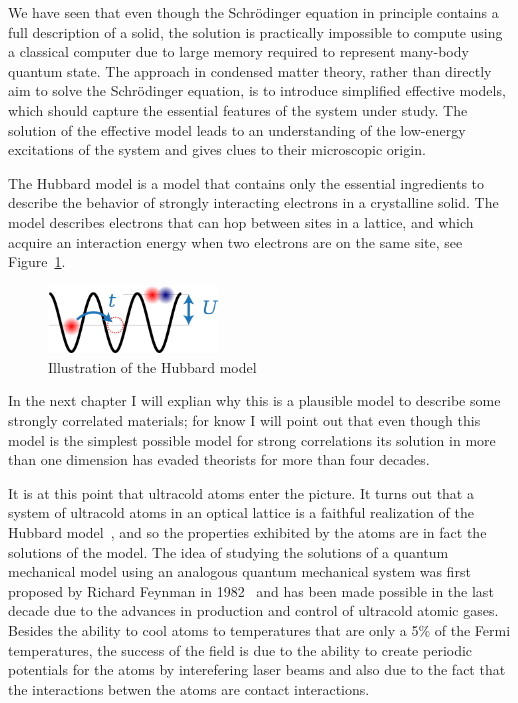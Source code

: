 \documentclass[oneside,11pt]{memoir}
\begin{document}
We have seen that even though the Schr\"{o}dinger equation in principle
contains a full description of a solid,  the solution is practically impossible
to compute using a classical computer due to large memory required to represent
many-body quantum state.   
The approach in condensed matter theory, rather than directly aim to solve the
Schr\"{o}dinger equation, is to introduce simplified effective models, which
should capture the essential features of the system under study.  The solution
of the effective model leads to an understanding of the low-energy excitations
of the system and gives clues to their microscopic origin.   

The Hubbard model is a model that contains only the essential ingredients
to describe the  behavior of strongly interacting electrons in a crystalline
solid.    The model describes electrons that can hop between sites in a
lattice, and which acquire an interaction energy when two electrons are on the
same site, see Figure~\ref{fig:chap01hubbard}.  
\begin{figure} \centering
\includegraphics[width=0.4\textwidth]{../figures/hubbard/little-hubbard.png}
\caption[Hubbard model]{\small Illustration of the Hubbard model }
\label{fig:chap01hubbard}
\end{figure}
In the next chapter I will explian why this is a plausible model to
describe some strongly correlated materials;  for know I will point out that
even though this model is the simplest possible model for strong correlations
its solution in more than one dimension has evaded theorists for more than four
decades.

It is at this point that ultracold atoms enter the picture.   It turns out that
a system of ultracold atoms in an optical lattice is a faithful realization of
the Hubbard model~\cite{PhysRevLett.81.3108}, and so the properties exhibited
by the atoms are in fact the solutions of the model.   The idea of studying the
solutions of a quantum mechanical model using an analogous quantum mechanical
system was first proposed by Richard Feynman in
1982~\cite{feynman1982simulating} and has been made possible in the last decade
due to the advances in production and control of ultracold atomic gases.   Besides the ability to cool atoms to temperatures that are only a 5\% of the Fermi temperatures,   the success of the field is due to the ability to create periodic potentials for the atoms by interefering laser beams and also due to the fact that the interactions betwen the atoms are contact interactions.
\end{document}
